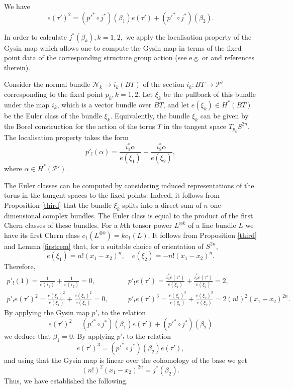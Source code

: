 \documentclass[11pt]{amsart}
\theoremstyle{definition}
\theoremstyle{remark}
\numberwithin{equation}{section}
\begin{document}
We have
\[
e(\tau')^2 = ({p'}^* \circ j^*)(\beta_1)e(\tau')+({p'}^*\circ j^*)(\beta_2).
\]

In order to calculate $j^*(\beta_k), k=1,2,$ we  apply the localisation property of the Gysin map which allows one to compute the Gysin map in terms of the fixed point data of the corresponding structure group action (see e.g. \cite{Audin1991book} or \cite{Tu} and references therein). 

Consider the normal bundle 
${\mathcal N}_k \to i_k(BT)$ of the section $i_k\colon BT \to \mathcal{P}'$ corresponding to the fixed point $p_k, k=1,2$. Let ${\xi}_k$ be the pullback of this bundle under the map $i_k$, which is a vector bundle over $BT$, and let $e({\xi}_k)\in H^*(BT)$ be the Euler class of the bundle ${\xi}_k$. Equivalently, the bundle $\xi_k$ can be given by the Borel construction for the action of the torus $T$ in the tangent space $T_{p_k} S^{2n}$. 
The localisation property takes the form 
\[
p'_!(\alpha) = \frac{i^*_1 \alpha}{e({\xi}_1)} + \frac{i^*_2 \alpha}{e({\xi}_2)},
\]
where $\alpha\in H^*(\mathcal P')$.

The Euler classes  can be computed by considering  induced representations of the torus in the tangent spaces to the fixed points. Indeed, it follows from Proposition \ref{third} that the bundle ${\xi}_k$ splits into a direct sum of $n$ one-dimensional complex bundles. 
The Euler class is equal to the product of the first Chern classes of these bundles. For a $k$th tensor power $L^{\otimes k}$ of a line bundle $L$ we have its first Chern class $c_1(L^{\otimes k})=k c_1(L)$. It follows from Proposition \ref{third} and Lemma \ref{firstrem} that, for a suitable choice of orientation of $S^{2n}$,  
\[
e({\xi}_1) = n!(x_1-x_2)^n, \quad e({\xi}_2) = -n! (x_1-x_2)^n.
\]
Therefore,
\begin{align*}
p'_!(1)=\frac{1}{e(i_1)}+\frac{1}{e(i_2)}=0, \qquad &
p'_!e(\tau')=\frac{i^*_1e(\tau')}{e(\xi_1)}+\frac{i^*_2e(\tau')}{e(\xi_2)}=2,
\\
p'_!e(\tau')^2=\frac{e(\xi_1)^2}{e(\xi_1)}+\frac{e(\xi_2)^2}{e(\xi_2)}=0, \qquad &
p'_!e(\tau')^3 = \frac{e(\xi_1)^3}{e(\xi_1)}+\frac{e(\xi_2)^3}{e(\xi_2)}=2(n!)^2(x_1-x_2)^{2n}.
\end{align*}
By applying the Gysin map $p'_!$ to the relation
\[
e(\tau')^2=(p'^*\circ j^*)(\beta_1)e(\tau') + (p'^* \circ j^*)(\beta_2)
\]
we deduce that $\beta_1=0$. By applying $p'_!$ to the relation
\[
e(\tau')^3=(p'^*\circ j^*)(\beta_2)e(\tau'),
\]
and using that the Gysin map is linear over the cohomology of the base we get
$$
(n!)^2 (x_1-x_2)^{2n} = j^*(\beta_2).
$$
Thus, we have established the following.
\end{document}
